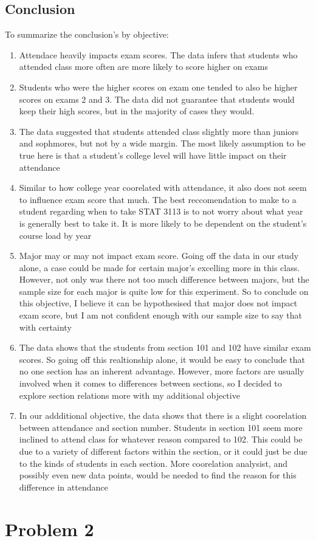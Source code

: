 \documentclass[14pt]{article}
\begin{document}
\begin{enumerate}
\pagebreak

\end{enumerate}


\subsection*{Conclusion}
To summarize the conclusion's by objective: 

\begin{enumerate}
\item Attendace heavily impacts exam scores. The data infers that students who attended class more often are more likely to score higher on exams
\item Students who were the higher scores on exam one tended to also be higher scores on exams 2 and 3. The data did not guarantee that students would keep their high scores, but in the majority of cases they would.
\item The data suggested that students attended class slightly more than juniors and sophmores, but not by a wide margin. The most likely assumption to be true here is that a student's college level will have little impact on their attendance
\item Similar to how college year coorelated with attendance, it also does not seem to influence exam score that much. The best reccomendation to make to a student regarding when to take STAT 3113 is to not worry about what year is generally best to take it. It is more likely to be dependent on the student's course load by year 
\item Major may or may not impact exam score. Going off the data in our study alone, a case could be made for certain major's excelling more in this class. However, not only was there not too much difference between majors, but the sample size for each major is quite low for this experiment. So to conclude on this objective, I believe it can be hypothesised that major does not impact exam score, but I am not confident enough with our sample size to say that with certainty
\item The data shows that the students from section 101 and 102 have similar exam scores. So going off this realtionship alone, it would be easy to conclude that no one section has an inherent advantage. However, more factors are usually involved when it comes to differences between sections, so I decided to explore section relations more with my additional objective
\item In our addditional objective, the data shows that there is a slight coorelation between attendance and section number. Students in section 101 seem more inclined to attend class for whatever reason compared to 102. This could be due to a variety of different factors within the section, or it could just be due to the kinds of students in each section. More coorelation analysist, and possibly even new data points, would be needed to find the reason for this difference in attendance
\end{enumerate}

\section*{Problem 2}
\end{document}
